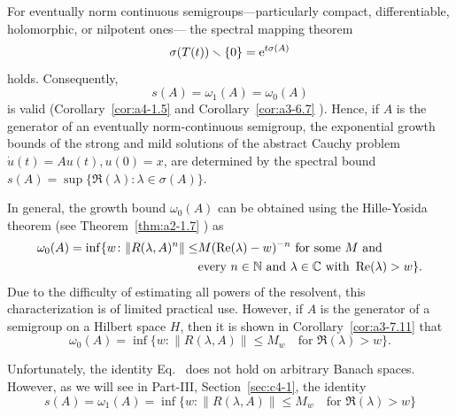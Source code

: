\begin{remark}\label{rem:a4-1.7}
For eventually norm continuous semigroups---particularly compact, differentiable, holomorphic, or nilpotent ones--- the spectral mapping theorem 
\begin{equation}\label{eq:a4-1.7}
\sigma(T(t)) \smallsetminus \{0\} = \mathrm{e}^{t \sigma(A)}
\end{equation}
holds. 
Consequently,
\begin{equation}\label{eq:a4-1.8}
s(A) = \omega_1(A) = \omega_{0}(A)
\end{equation}
is valid (Corollary~\ref{cor:a4-1.5} and Corollary~\ref{cor:a3-6.7} ).
Hence, if\/ $A$ is the generator of an eventually norm-continuous semigroup, the exponential growth bounds of the strong and mild solutions of the abstract Cauchy problem $\dot{u}(t) = A u(t), u(0) = x$, are determined by the spectral bound
$s(A) = \sup\{\Re(\lambda)\colon\lambda \in \sigma(A)\}.$
\end{remark}
\begin{remark} In general, the growth bound $\omega_{0}(A)$ can be obtained using the Hille-Yosida theorem (see Theorem~\ref{thm:a2-1.7} ) as
\begin{equation}\label{eq:a4-1.9}
\begin{split}
\omega_{0}(A) = \inf \{ w\colon\|R(\lambda, A)^n\| \leq &M ( \Re(\lambda) - w)^{-n} \text{ for some } M \text{ and}\\
&\text{every } n \in \N \text{ and } \lambda \in \C \text{ with } \Re(\lambda) > w\}. 
\end{split}
\end{equation}
Due to the difficulty of estimating all powers of the resolvent, this characterization is of limited practical use. 
However, if\/ $A$ is the generator of a semigroup on a Hilbert space $H$, then it is shown in Corollary~\ref{cor:a3-7.11}  that
\begin{equation}\label{eq:a4-1.10}
 \omega_{0}(A) = \inf \{ w\colon\| R(\lambda, A) \| \leq M_w \quad \text{for } \Re(\lambda) > w \}.
\end{equation}
\end{remark}
Unfortunately, the identity Eq.~ does not hold on arbitrary Banach spaces. 
However, as we will see in Part-III, Section~\ref{sec:c4-1},  the identity 
\begin{equation}\label{eq:a4-1.11}
 s(A)=\omega_1(A) = \inf \{ w\colon\| R(\lambda, A) \| \leq M_w \quad \text{for } \Re(\lambda) > w \}
\end{equation}

